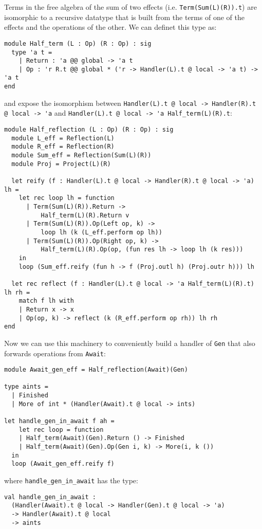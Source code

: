 \documentclass[acmsmall, screen, nonacm]{acmart}
\theoremstyle{definition}
\begin{document}
Terms in the free algebra of the sum of two effects
(i.e. \lstinline[style=ocaml]{Term(Sum(L)(R)).t}) are isomorphic to a
recursive datatype that is built from the terms of one of the effects
and the operations of the other\cite{??}. We can definet this type as:
\begin{lstlisting}[style=ocaml]
module Half_term (L : Op) (R : Op) : sig
  type 'a t =
    | Return : 'a @@ global -> 'a t
    | Op : 'r R.t @@ global * ('r -> Handler(L).t @ local -> 'a t) -> 'a t
end
\end{lstlisting}
and expose the isomorphism between
\lstinline[style=ocaml]{Handler(L).t @ local -> Handler(R).t @ local -> 'a}
and \lstinline[style=ocaml]{Handler(L).t @ local -> 'a Half_term(L)(R).t}:
\begin{lstlisting}[style=ocaml]
module Half_reflection (L : Op) (R : Op) : sig
  module L_eff = Reflection(L)
  module R_eff = Reflection(R)
  module Sum_eff = Reflection(Sum(L)(R))
  module Proj = Project(L)(R)

  let reify (f : Handler(L).t @ local -> Handler(R).t @ local -> 'a) lh =
    let rec loop lh = function
      | Term(Sum(L)(R)).Return ->
          Half_term(L)(R).Return v
      | Term(Sum(L)(R)).Op(Left op, k) ->
          loop lh (k (L_eff.perform op lh))
      | Term(Sum(L)(R)).Op(Right op, k) ->
          Half_term(L)(R).Op(op, (fun res lh -> loop lh (k res)))
    in
    loop (Sum_eff.reify (fun h -> f (Proj.outl h) (Proj.outr h))) lh

  let rec reflect (f : Handler(L).t @ local -> 'a Half_term(L)(R).t) lh rh =
    match f lh with
    | Return x -> x
    | Op(op, k) -> reflect (k (R_eff.perform op rh)) lh rh
end
\end{lstlisting}

Now we can use this machinery to conveniently build a handler of
\lstinline[style=ocaml]{Gen} that also forwards operations from
\lstinline[style=ocaml]{Await}:
\begin{lstlisting}[style=ocaml]
module Await_gen_eff = Half_reflection(Await)(Gen)

type aints =
  | Finished
  | More of int * (Handler(Await).t @ local -> ints)

let handle_gen_in_await f ah =
    let rec loop = function
    | Half_term(Await)(Gen).Return () -> Finished
    | Half_term(Await)(Gen).Op(Gen i, k) -> More(i, k ())
  in
  loop (Await_gen_eff.reify f)
\end{lstlisting}
where \lstinline[style=ocaml]{handle_gen_in_await} has the type:
\begin{lstlisting}[style=ocaml]
val handle_gen_in_await :
  (Handler(Await).t @ local -> Handler(Gen).t @ local -> 'a)
  -> Handler(Await).t @ local
  -> aints
\end{lstlisting}
\end{document}
